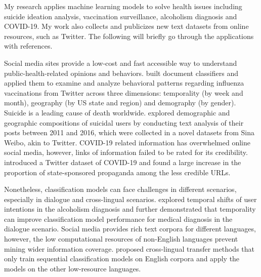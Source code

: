 My research applies machine learning models to solve health issues including suicide ideation analysis, vaccination surveillance, alcoholism diagnosis and COVID-19. 
My work also collects and publicizes new text datasets from online resources, such as Twitter. 
The following will briefly go through the applications with references.

Social media sites provide a low-cost and fast accessible way to understand public-health-related opinions and behaviors. \cite{huang2017examining, huang2019can} built document classifiers and applied them to examine and analyze behavioral patterns regarding influenza vaccinations from Twitter across three dimensions: temporality (by week and month), geography (by US state and region) and demography (by gender).
Suicide is a leading cause of death worldwide. \cite{huang2017exploring} explored demographic and geographic compositions of suicidal users by conducting text analysis of their posts between 2011 and 2016, which were collected in a novel datasets from Sina Weibo, akin to Twitter.
COVID-19 related information has overwhelmed online social media, however, links of information failed to be rated for its credibility. \cite{broniatowski2020covid, huang2020coronavirus} introduced a Twitter dataset of COVID-19 and found a large increase in the proportion of state-sponsored propaganda among the less credible URLs.

Nonetheless, classification models can face challenges in different scenarios, especially in dialogue and cross-lingual scenarios. \cite{huang2018modeling} explored temporal shifts of user intentions in the alcoholism diagnosis and further demonstrated that temporality can improve classification model performance for medical diagnosis in the dialogue scenario.
Social media provides rich text corpora for different languages, however, the low computational resources of non-English languages prevent mining wider information coverage. 
\cite{huang2019matters} proposed cross-lingual transfer methods that only train sequential classification models on English corpora and apply the models on the other low-resource languages.
